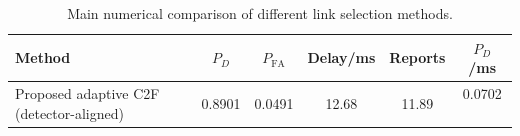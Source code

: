 \begin{table}[t]
    \centering
    \caption{Main numerical comparison of different link selection methods.}
    \label{tab:main_summary}
    \begin{tabular}{l c c c c c}
        \hline
        Method & $P_D$ & $P_{\mathrm{FA}}$ & Delay/ms & Reports & $P_D$/ms \\
        \hline
        Proposed adaptive C2F (detector-aligned) & 0.8901 & 0.0491 & 12.68 & 11.89 & 0.0702 \
        \hline
    \end{tabular}
\end{table}

